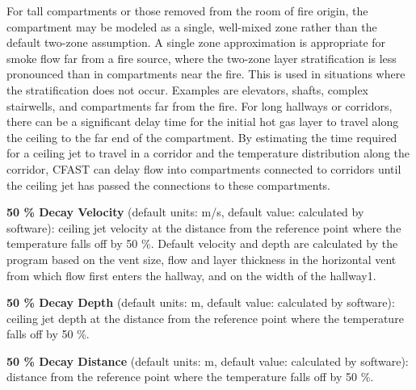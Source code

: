 For tall compartments or those removed from the room of fire origin, the compartment may be modeled as a single, well-mixed zone rather than the default two-zone assumption. A single zone approximation is appropriate for smoke flow far from a fire source, where the two-zone layer stratification is less pronounced than in compartments near the fire. This is used in situations where the stratification does not occur. Examples are elevators, shafts, complex stairwells, and compartments far from the fire.
For long hallways or corridors, there can be a significant delay time for the initial hot gas layer to travel along the ceiling to the far end of the compartment. By estimating the time required for a ceiling jet to travel in a corridor and the temperature distribution along the corridor, CFAST can delay flow into compartments connected to corridors until the ceiling jet has passed the connections to these compartments.



\textbf{50 \% Decay Velocity} (default units: m/s, default value: calculated by software): ceiling jet velocity at the distance from the reference point where the temperature falls off by 50 \%. Default velocity and depth are calculated by the program based on the vent size, flow and layer thickness in the horizontal vent from which flow first enters the hallway, and on the width of the hallway1.

\textbf{50 \% Decay Depth} (default units: m, default value: calculated by software): ceiling jet depth at the distance from the reference point where the temperature falls off by 50 \%. 

\textbf{50 \% Decay Distance} (default units: m, default value: calculated by software): distance from the reference point where the temperature falls off by 50 \%.

